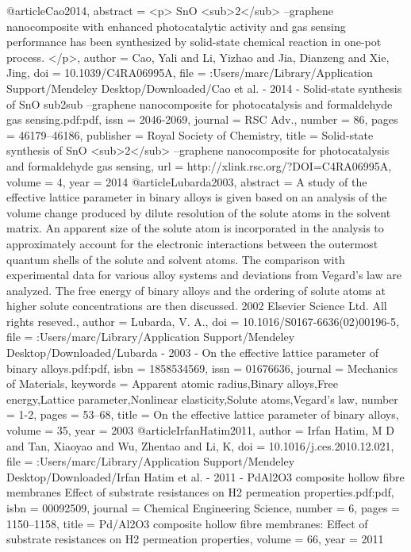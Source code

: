 @article{Cao2014,
abstract = {{\textless}p{\textgreater} SnO {\textless}sub{\textgreater}2{\textless}/sub{\textgreater} –graphene nanocomposite with enhanced photocatalytic activity and gas sensing performance has been synthesized by solid-state chemical reaction in one-pot process. {\textless}/p{\textgreater}},
author = {Cao, Yali and Li, Yizhao and Jia, Dianzeng and Xie, Jing},
doi = {10.1039/C4RA06995A},
file = {:Users/marc/Library/Application Support/Mendeley Desktop/Downloaded/Cao et al. - 2014 - Solid-state synthesis of SnO sub2sub –graphene nanocomposite for photocatalysis and formaldehyde gas sensing.pdf:pdf},
issn = {2046-2069},
journal = {RSC Adv.},
number = {86},
pages = {46179--46186},
publisher = {Royal Society of Chemistry},
title = {{Solid-state synthesis of SnO {\textless}sub{\textgreater}2{\textless}/sub{\textgreater} –graphene nanocomposite for photocatalysis and formaldehyde gas sensing}},
url = {http://xlink.rsc.org/?DOI=C4RA06995A},
volume = {4},
year = {2014}
}
@article{Lubarda2003,
abstract = {A study of the effective lattice parameter in binary alloys is given based on an analysis of the volume change produced by dilute resolution of the solute atoms in the solvent matrix. An apparent size of the solute atom is incorporated in the analysis to approximately account for the electronic interactions between the outermost quantum shells of the solute and solvent atoms. The comparison with experimental data for various alloy systems and deviations from Vegard's law are analyzed. The free energy of binary alloys and the ordering of solute atoms at higher solute concentrations are then discussed. {\textcopyright} 2002 Elsevier Science Ltd. All rights reseved.},
author = {Lubarda, V. A.},
doi = {10.1016/S0167-6636(02)00196-5},
file = {:Users/marc/Library/Application Support/Mendeley Desktop/Downloaded/Lubarda - 2003 - On the effective lattice parameter of binary alloys.pdf:pdf},
isbn = {1858534569},
issn = {01676636},
journal = {Mechanics of Materials},
keywords = {Apparent atomic radius,Binary alloys,Free energy,Lattice parameter,Nonlinear elasticity,Solute atoms,Vegard's law},
number = {1-2},
pages = {53--68},
title = {{On the effective lattice parameter of binary alloys}},
volume = {35},
year = {2003}
}
@article{IrfanHatim2011,
author = {{Irfan Hatim}, M D and Tan, Xiaoyao and Wu, Zhentao and Li, K},
doi = {10.1016/j.ces.2010.12.021},
file = {:Users/marc/Library/Application Support/Mendeley Desktop/Downloaded/Irfan Hatim et al. - 2011 - PdAl2O3 composite hollow fibre membranes Effect of substrate resistances on H2 permeation properties.pdf:pdf},
isbn = {00092509},
journal = {Chemical Engineering Science},
number = {6},
pages = {1150--1158},
title = {{Pd/Al2O3 composite hollow fibre membranes: Effect of substrate resistances on H2 permeation properties}},
volume = {66},
year = {2011}
}
